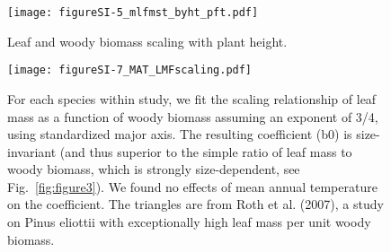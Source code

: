 \documentclass[a4paper]{article}\usepackage[]{graphicx}\usepackage[]{color}
\begin{document}
\begin{figure}[h!]
    \centering
    \texttt{[image: figureSI-5\_mlfmst\_byht\_pft.pdf]}
    \caption{Leaf and woody biomass scaling with plant height.}
    \label{fig:figureSI5}
\end{figure}

\begin{figure}[h!]
    \centering
    \texttt{[image: figureSI-7\_MAT\_LMFscaling.pdf]}
    \caption{For each species within study, we fit the scaling relationship of leaf mass as a function of woody biomass assuming an exponent of 3/4, using standardized major axis. The resulting coefficient (b0) is size-invariant (and thus superior to the simple ratio of leaf mass to woody biomass, which is strongly size-dependent, see Fig.~\ref{fig:figure3}). We found no effects of mean annual temperature on the coefficient. The triangles are from Roth et al. (2007), a study on Pinus eliottii with exceptionally high leaf mass per unit woody biomass.}
    \label{fig:figureSI7}
\end{figure}




\clearpage

\end{document}
